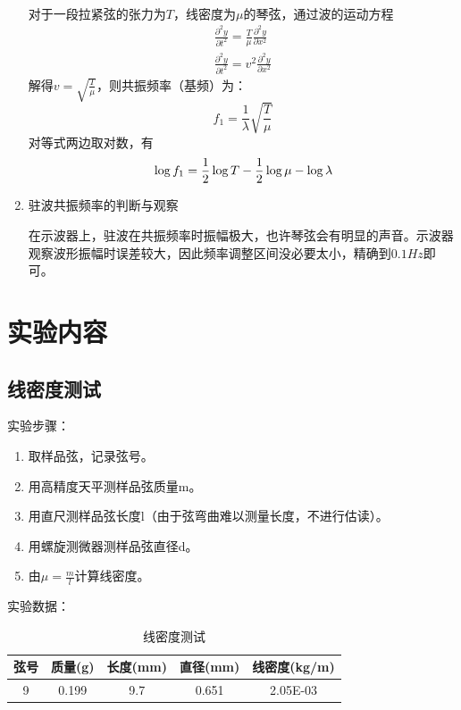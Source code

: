 \documentclass[11pt]{article}
\begin{document}
\begin{enumerate}
    \\\hspace*{2em}对于一段拉紧弦的张力为$T$，线密度为$\mu$的琴弦，通过波的运动方程
    \begin{equation}
        \begin{split}
            \frac{\partial^2y}{\partial t^2}=\frac{T}{\mu}\frac{\partial^2y}{\partial x^2} \\
            \frac{\partial^2y}{\partial t^2}=v^2\frac{\partial^2y}{\partial x^2}
        \end{split}
    \end{equation}
    解得$v=\sqrt{\frac{T}{\mu}}$，则共振频率（基频）为：
    \begin{equation}
        f_1=\frac{1}{\lambda}\sqrt{\frac{T}{\mu}}
    \end{equation}
    对等式两边取对数，有
    \begin{equation}{\label{equ:8}}
        \log f_1=\frac{1}{2}\log T-\frac{1}{2}\log \mu-\log \lambda
    \end{equation}
    \item 驻波共振频率的判断与观察
    \par \hspace*{2em}在示波器上，驻波在共振频率时振幅极大，也许琴弦会有明显的声音。示波器观察波形振幅时误差较大，因此频率调整区间没必要太小，精确到$0.1Hz$即可。
\end{enumerate}


\section{实验内容}
\subsection{线密度测试}
\noindent 实验步骤：
\begin{enumerate}
    \item 取样品弦，记录弦号。
    \item 用高精度天平测样品弦质量m。
    \item 用直尺测样品弦长度l（由于弦弯曲难以测量长度，不进行估读）。
    \item 用螺旋测微器测样品弦直径d。
    \item 由$\mu=\frac{m}{l}$计算线密度。
\end{enumerate}
\noindent 实验数据：
\begin{table}[H]
    \centering
    \caption{线密度测试}
    \begin{tabular}{|c|c|c|c|c|}
    \hline
        弦号 & 质量(g) & 长度(mm) & 直径(mm) & 线密度(kg/m) \\ \hline
        9 & 0.199 & 9.7 & 0.651 & 2.05E-03 \\ \hline
    \end{tabular}
\end{table}
\end{document}
